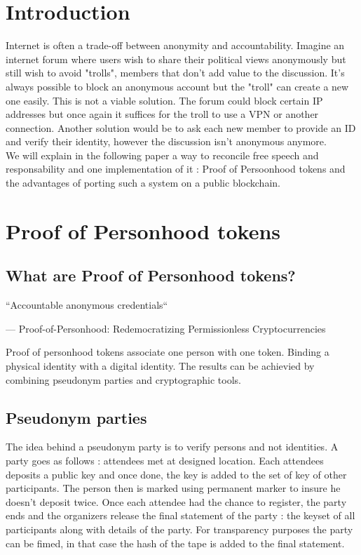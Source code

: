 \documentclass[11pt, a4paper, twoside, openright]{book} %
\begin{document}





\newpage

\section{Introduction}
Internet is often a	trade-off between anonymity and accountability. Imagine an internet forum where users wish to share their political views anonymously but still wish to avoid "trolls", members that don't add value to the discussion. It's always possible to block an anonymous account but the "troll" can create a new one easily. This is not a viable solution. The forum could block certain IP addresses but once again it suffices for the troll to use a VPN or another connection. Another solution would be to ask each new member to provide an ID and verify their identity, however the discussion isn't anonymous anymore. \\
We will explain in the following paper a way to reconcile free speech and responsability and one implementation of it : Proof of Persoonhood tokens and the advantages of porting such a system on a public blockchain.



\section{Proof of Personhood tokens}
\subsection{What are Proof of Personhood tokens?}

\epigraph{``Accountable anonymous credentials``}
{--- \textup{Proof-of-Personhood: Redemocratizing Permissionless Cryptocurrencies}}

Proof of personhood tokens associate one person with one token. Binding a physical identity with a digital identity. The results can be achievied by combining pseudonym parties and cryptographic tools.

\subsection{Pseudonym parties}

The idea behind a pseudonym party is to verify persons and not identities. A party goes as follows :  attendees met at designed location. Each attendees deposits a public key and once done, the key is added to the set of key of other participants. The person then is marked using permanent marker to insure he doesn't deposit twice. Once each attendee had the chance to register, the party ends and the organizers release the final statement of the party : the keyset of all participants along with details of the party. For transparency purposes the party can be fimed, in that case the hash of the tape is added to the final statement. 
 
\end{document}
